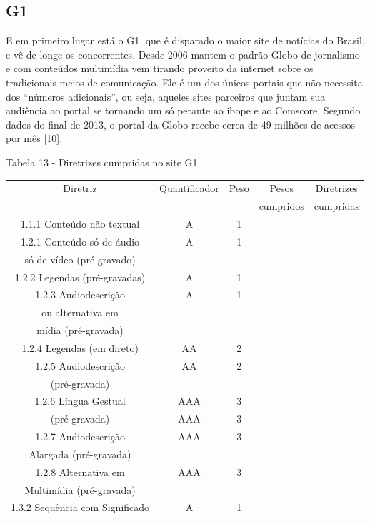 \documentclass[a4paper]{article}
\begin{document}
\begin{titlepage}
\subsection{G1}

E em primeiro lugar está o G1, que é disparado o maior site de notícias do Brasil, e vê de longe os concorrentes. Desde 2006 mantem o padrão Globo de jornalismo e com conteúdos multimídia vem tirando proveito da internet sobre os tradicionais meios de comunicação. Ele é um dos únicos portais que não necessita dos “números adicionais”, ou seja, aqueles sites parceiros que juntam sua audiência ao portal se tornando um só perante ao ibope e ao Comscore. Segundo dados do final de 2013, o portal da Globo recebe cerca de 49 milhões de acessos por mês [10].

Tabela 13 - Diretrizes cumpridas no site G1\\[-1cm]
\begin{center}
	\fontsize{8pt}{8pt}\selectfont	
	\begin{longtable}{|c|c|c|c|c|}
		\hline
		Diretriz & Quantificador & Peso & Pesos & Diretrizes\\
		& & & cumpridos & cumpridas\\
		\hline
		1.1.1 Conteúdo não textual & A & 1 & & \\
		\hline
		1.2.1 Conteúdo só de áudio & A & 1 & & \\
		só de vídeo (pré-gravado) & & & & \\
		\hline
		1.2.2 Legendas (pré-gravadas) & A & 1 & & \\
		\hline
		1.2.3 Audiodescrição & A & 1 & & \\
		ou alternativa em & & & & \\
		mídia (pré-gravada) & & & & \\
		\hline
		1.2.4 Legendas (em direto) & AA & 2 & & \\
		\hline
		1.2.5 Audiodescrição & AA & 2 & & \\
		(pré-gravada) & & & & \\
		\hline
		1.2.6 Língua Gestual & AAA & 3 & & \\
		(pré-gravada) & AAA & 3 & & \\
		\hline
		1.2.7 Audiodescrição & AAA & 3 & & \\
		Alargada (pré-gravada) & & & & \\
		\hline
		1.2.8 Alternativa em & AAA & 3 & & \\
		Multimídia (pré-gravada) & & & & \\
		\hline
		1.3.2 Sequência com Significado & A & 1 & & \\

\end{longtable}
\end{center}
\end{titlepage}
\end{document}
